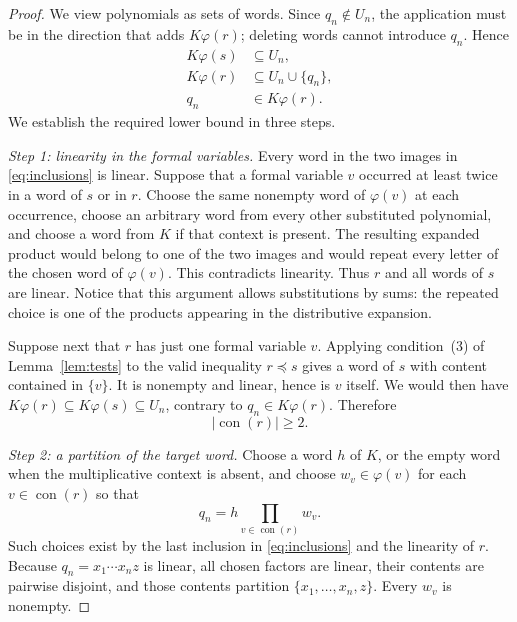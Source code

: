 \documentclass[11pt,reqno]{amsart}
\numberwithin{equation}{section}
\theoremstyle{definition}
\theoremstyle{remark}
\DeclareMathOperator{\con}{con}
\begin{document}
\begin{proof}
We view polynomials as sets of words. Since $q_n\notin U_n$,
the application must be in the direction that adds
$K\varphi(r)$; deleting words cannot introduce $q_n$. Hence
\begin{equation}\label{eq:inclusions}
\begin{aligned}
K\varphi(s)&\subseteq U_n,\\
K\varphi(r)&\subseteq U_n\cup\{q_n\},\\
q_n&\in K\varphi(r).
\end{aligned}
\end{equation}
We establish the required lower bound in three steps.

\emph{Step 1: linearity in the formal variables.}
Every word in the two images in \eqref{eq:inclusions} is
linear. Suppose that a formal variable $v$ occurred at least
twice in a word of $s$ or in $r$. Choose the same nonempty
word of $\varphi(v)$ at each occurrence, choose an arbitrary
word from every other substituted polynomial, and choose a
word from $K$ if that context is present. The resulting
expanded product would belong to one of the two images and
would repeat every letter of the chosen word of $\varphi(v)$.
This contradicts linearity. Thus $r$ and all words of $s$
are linear. Notice that this argument allows substitutions
by sums: the repeated choice is one of the products appearing
in the distributive expansion.

Suppose next that $r$ has just one formal variable $v$.
Applying condition~(3) of Lemma~\ref{lem:tests} to the valid
inequality $r\preceq s$ gives a word of $s$ with content
contained in $\{v\}$. It is nonempty and linear, hence is
$v$ itself. We would then have
$K\varphi(r)\subseteq K\varphi(s)\subseteq U_n$, contrary
to $q_n\in K\varphi(r)$. Therefore
\begin{equation}\label{eq:atleasttwo}
|\con(r)|\geq2.
\end{equation}

\emph{Step 2: a partition of the target word.}
Choose a word $h$ of $K$, or the empty word when the
multiplicative context is absent, and choose
$w_v\in\varphi(v)$ for each $v\in\con(r)$ so that
\begin{equation}\label{eq:partition}
q_n=h\prod_{v\in\con(r)}w_v.
\end{equation}
Such choices exist by the last inclusion in
\eqref{eq:inclusions} and the linearity of $r$.
Because $q_n=x_1\cdots x_nz$ is linear, all chosen factors
are linear, their contents are pairwise disjoint, and those
contents partition $\{x_1,\ldots,x_n,z\}$. Every $w_v$
is nonempty.


\end{proof}
\end{document}
